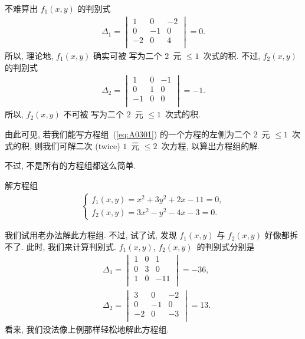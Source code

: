 \documentclass[%
    UTF8,%
    fontset=none,%
    punct=kaiming,%
    zihao=-4,%
    a4paper,%
    oneside,%
]{ctexbook}
\renewcommand*{\leq}{\leqslant}
\begin{document}
\begin{example}
    不难算出 \(f_1 (x, y)\) 的判别式
    \begin{align*}
        \Delta_1
        =
        \begin{vmatrix}
            1  & 0  & -2 \\
            0  & -1 & 0  \\
            -2 & 0  & 4  \\
        \end{vmatrix}
        = 0.
    \end{align*}
    所以, 理论地, \(f_1 (x, y)\) 确实可被%
    写为二个 \(2\)~元 \({\leq} 1\)~次式的积.
    不过, \(f_2 (x, y)\) 的判别式
    \begin{align*}
        \Delta_2
        =
        \begin{vmatrix}
            1  & 0 & -1 \\
            0  & 1 & 0  \\
            -1 & 0 & 0  \\
        \end{vmatrix}
        = -1.
    \end{align*}
    所以, \(f_2 (x, y)\) 不可被%
    写为二个 \(2\)~元 \({\leq} 1\)~次式的积.
\end{example}

由此可见, 若我们能写方程组~(\ref{eq:A0301})
的一个方程的左侧为二个 \(2\)~元 \({\leq} 1\)~次式的积,
则我们可解二次 (twice) \(1\)~元 \({\leq} 2\)~次方程,
以算出方程组的解.

不过, 不是所有的方程组都这么简单.

\begin{example}[label=emp:A0301]
    解方程组
    \begin{align*}
        \begin{cases}
            f_1 (x, y) = x^2 + 3y^2 + 2x - 11 = 0, \\
            f_2 (x, y) = 3x^2 - y^2 - 4x - 3 = 0.
        \end{cases}
    \end{align*}

    我们试用老办法解此方程组.
    不过, 试了试, 发现
    \(f_1 (x, y)\) 与 \(f_2 (x, y)\)
    好像都拆不了.
    此时, 我们来计算判别式.
    \(f_1 (x, y)\), \(f_2 (x, y)\)~的判别式分别是
    \begin{align*}
         & \Delta_1
        =
        \begin{vmatrix}
            1 & 0 & 1   \\
            0 & 3 & 0   \\
            1 & 0 & -11 \\
        \end{vmatrix}
        = -36,
        \\
         & \Delta_2
        =
        \begin{vmatrix}
            3  & 0  & -2 \\
            0  & -1 & 0  \\
            -2 & 0  & -3 \\
        \end{vmatrix}
        = 13.
    \end{align*}
    看来, 我们没法像上例那样轻松地解此方程组.
\end{example}
\end{document}
